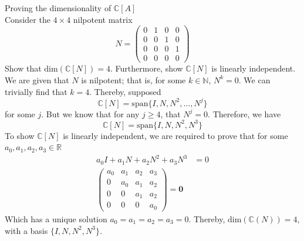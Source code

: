 \documentclass[journal, letterpaper]{IEEEtran}
\begin{document}
    \begin{myboxg}{Proving the dimensionality of $\mathbb{C}[A]$} \\ 
        Consider the $4 \times 4$ nilpotent matrix
        $$ N = \begin{pmatrix}
            0 & 1 & 0 & 0 \\ 0 & 0 & 1 & 0 \\ 0 & 0 & 0 & 1 \\ 0 & 0 & 0 & 0
        \end{pmatrix}$$
        Show that $\text{dim}(\mathbb{C}[N]) = 4$. Furthermore, show $\mathbb{C}[N]$ is linearly independent.
        \newline \\ 
        We are given that $N$ is nilpotent; that is, for some $k \in \mathbb{N}$, $N^k = 0$. We can 
        trivially find that $k = 4$. Thereby, supposed 
        $$ \mathbb{C}[N] = \text{span}\{I, N, N^2, \dots, N^j\}$$
        for some $j$. But we know that for any $j \ge 4$, that $N^j = 0$. Therefore, we have
        $$ \mathbb{C}[N] = \text{span}\{I, N, N^2, N^3\}$$
        To show $\mathbb{C}[N]$ is linearly independent, we are required to prove that for some $a_0, a_1, a_2, a_3 \in \mathbb{R}$
        \begin{align*}
            a_0I + a_1N + a_2N^2 + a_3N^3 &= 0 \\ 
            \begin{pmatrix}
                a_0 & a_1 & a_2 & a_3 \\ 0 & a_0 & a_1 & a_2 \\ 0 & 0 & a_1 & a_2 \\ 0 & 0 & 0 & a_0
            \end{pmatrix} = \mathbf{0}
        \end{align*}
        Which has a unique solution $a_0 = a_1 = a_2 = a_3 = 0$. Thereby, $\text{dim}(\mathbb{C}(N)) = 4$, with 
        a basis $\{I, N, N^2, N^3\}$.
    \end{myboxg}
\end{document}
